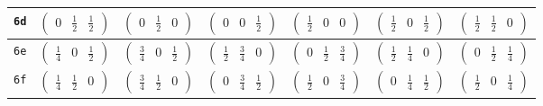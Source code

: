 \documentclass[fleqn,9pt,landscape]{jsarticle}
\begin{document}
\begin{center}
\begin{longtable}{ccccccc}
{\tt 6d} & $ \begin{pmatrix} 0 & \frac{1}{2} & \frac{1}{2} \end{pmatrix} $ & $ \begin{pmatrix} 0 & \frac{1}{2} & 0 \end{pmatrix} $ & $ \begin{pmatrix} 0 & 0 & \frac{1}{2} \end{pmatrix} $ & $ \begin{pmatrix} \frac{1}{2} & 0 & 0 \end{pmatrix} $ & $ \begin{pmatrix} \frac{1}{2} & 0 & \frac{1}{2} \end{pmatrix} $ & $ \begin{pmatrix} \frac{1}{2} & \frac{1}{2} & 0 \end{pmatrix} $ \\ \hline
{\tt 6e} & $ \begin{pmatrix} \frac{1}{4} & 0 & \frac{1}{2} \end{pmatrix} $ & $ \begin{pmatrix} \frac{3}{4} & 0 & \frac{1}{2} \end{pmatrix} $ & $ \begin{pmatrix} \frac{1}{2} & \frac{3}{4} & 0 \end{pmatrix} $ & $ \begin{pmatrix} 0 & \frac{1}{2} & \frac{3}{4} \end{pmatrix} $ & $ \begin{pmatrix} \frac{1}{2} & \frac{1}{4} & 0 \end{pmatrix} $ & $ \begin{pmatrix} 0 & \frac{1}{2} & \frac{1}{4} \end{pmatrix} $ \\ \hline
{\tt 6f} & $ \begin{pmatrix} \frac{1}{4} & \frac{1}{2} & 0 \end{pmatrix} $ & $ \begin{pmatrix} \frac{3}{4} & \frac{1}{2} & 0 \end{pmatrix} $ & $ \begin{pmatrix} 0 & \frac{3}{4} & \frac{1}{2} \end{pmatrix} $ & $ \begin{pmatrix} \frac{1}{2} & 0 & \frac{3}{4} \end{pmatrix} $ & $ \begin{pmatrix} 0 & \frac{1}{4} & \frac{1}{2} \end{pmatrix} $ & $ \begin{pmatrix} \frac{1}{2} & 0 & \frac{1}{4} \end{pmatrix} $ \\ \hline

\end{longtable}
\end{center}
\end{document}
